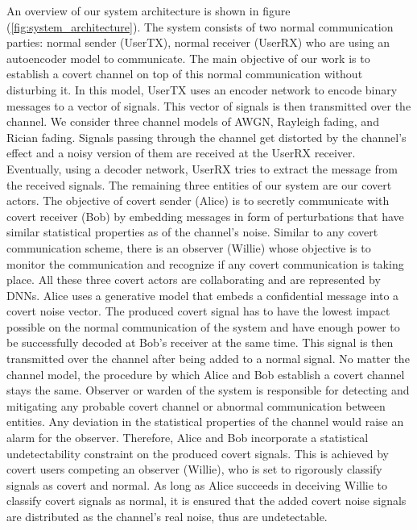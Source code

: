 An overview of our system architecture is shown in figure (\ref{fig:system_architecture}). The system consists of two normal communication parties: normal sender (UserTX), normal receiver (UserRX) who are using an autoencoder model to communicate. The main objective of our work is to establish a covert channel on top of this normal communication without disturbing it. In this model, UserTX uses an encoder network to encode binary messages to a vector of signals. This vector of signals is then transmitted over the channel. We consider three channel models of AWGN, Rayleigh fading, and Rician fading. Signals passing through the channel get distorted by the channel's effect and a noisy version of them are received at the UserRX receiver. Eventually, using a decoder network, UserRX tries to extract the message from the received signals. The remaining three entities of our system are our covert actors. The objective of covert sender (Alice) is to secretly communicate with covert receiver (Bob) by embedding messages in form of perturbations that have similar statistical properties as of the channel's noise. Similar to any covert communication scheme, there is an observer (Willie) whose objective is to monitor the communication and recognize if any covert communication is taking place. All these three covert actors are collaborating and are represented by DNNs. Alice uses a generative model that embeds a confidential message into a covert noise vector. The produced covert signal has to have the lowest impact possible on the normal communication of the system and have enough power to be successfully decoded at Bob's receiver at the same time. This signal is then transmitted over the channel after being added to a normal signal. No matter the channel model, the procedure by which Alice and Bob establish a covert channel stays the same. Observer or warden of the system is responsible for detecting and mitigating any probable covert channel or abnormal communication between entities. Any deviation in the statistical properties of the channel would raise an alarm for the observer. Therefore, Alice and Bob incorporate a statistical undetectability constraint on the produced covert signals. This is achieved by covert users competing an observer (Willie), who is set to rigorously classify signals as covert and normal. As long as Alice succeeds in deceiving Willie to classify covert signals as normal, it is ensured that the added covert noise signals are distributed as the channel's real noise, thus are undetectable.


